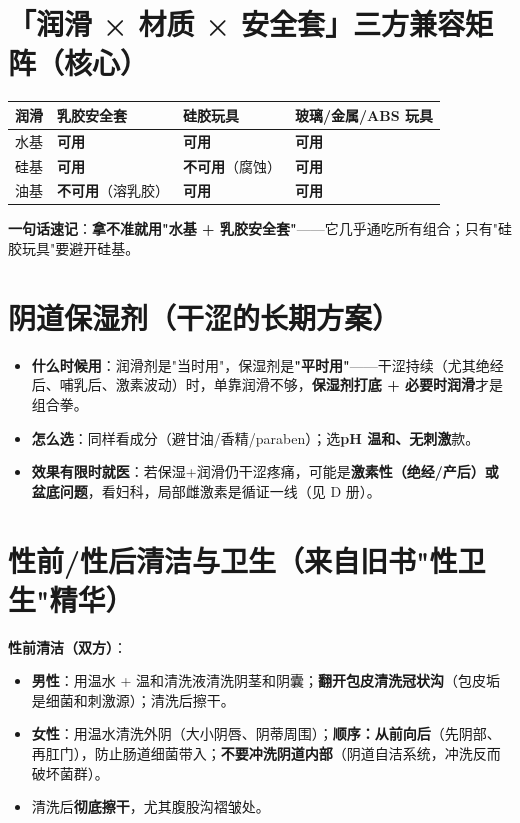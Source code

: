 \documentclass[12pt,UTF8,openany]{ctexbook}
\begin{document}
\section{「润滑 × 材质 × 安全套」三方兼容矩阵（核心）}
\begin{tabularx}{\textwidth}{X X X X}
\toprule
\textbf{润滑} & \textbf{乳胶安全套} & \textbf{硅胶玩具} & \textbf{玻璃/金属/ABS 玩具} \\
\midrule
水基 & \textbf{可用} & \textbf{可用} & \textbf{可用} \\
硅基 & \textbf{可用} & \textbf{不可用}（腐蚀） & \textbf{可用} \\
油基 & \textbf{不可用}（溶乳胶） & \textbf{可用} & \textbf{可用} \\
\bottomrule
\end{tabularx}
\par\smallskip
\textbf{一句话速记}：\textbf{拿不准就用"水基 + 乳胶安全套"}——它几乎通吃所有组合；只有"硅胶玩具"要避开硅基。

\section{阴道保湿剂（干涩的长期方案）}
\begin{itemize}[leftmargin=2em,itemsep=0.3em]
  \item \textbf{什么时候用}：润滑剂是"当时用"，保湿剂是\textbf{"平时用"}——干涩持续（尤其绝经后、哺乳后、激素波动）时，单靠润滑不够，\textbf{保湿剂打底 + 必要时润滑}才是组合拳。
  \item \textbf{怎么选}：同样看成分（避甘油/香精/paraben）；选\textbf{pH 温和、无刺激}款。
  \item \textbf{效果有限时就医}：若保湿+润滑仍干涩疼痛，可能是\textbf{激素性（绝经/产后）或盆底问题}，看妇科，局部雌激素是循证一线（见 D 册）。
\end{itemize}

\section{性前/性后清洁与卫生（来自旧书"性卫生"精华）}

\textbf{性前清洁（双方）}：

\begin{itemize}[leftmargin=2em,itemsep=0.3em]
  \item \textbf{男性}：用温水 + 温和清洗液清洗阴茎和阴囊；\textbf{翻开包皮清洗冠状沟}（包皮垢是细菌和刺激源）；清洗后擦干。
  \item \textbf{女性}：用温水清洗外阴（大小阴唇、阴蒂周围）；\textbf{顺序：从前向后}（先阴部、再肛门），防止肠道细菌带入；\textbf{不要冲洗阴道内部}（阴道自洁系统，冲洗反而破坏菌群）。
  \item 清洗后\textbf{彻底擦干}，尤其腹股沟褶皱处。
\end{itemize}
\end{document}
